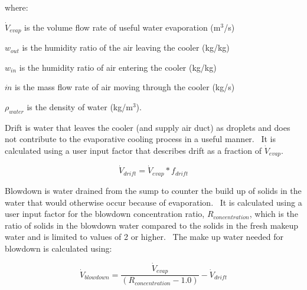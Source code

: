 where:

\({\dot V_{evap}}\) is the volume flow rate of useful water evaporation (m\(^{3}\)/s)

\({w_{out}}\) is the humidity ratio of the air leaving the cooler (kg/kg)

\({w_{in}}\) is the humidity ratio of air entering the cooler (kg/kg)

\(\dot m\) is the mass flow rate of air moving through the cooler (kg/s)

\({\rho_{water}}\) is the density of water (kg/m\(^{3}\)).

Drift is water that leaves the cooler (and supply air duct) as droplets and does not contribute to the evaporative cooling process in a useful manner.~ It is calculated using a user input factor that describes drift as a fraction of \({\dot V_{evap}}\).

\begin{equation}
{\dot V_{drift}} = {\dot V_{evap}} * {f_{drift}}
\end{equation}

Blowdown is water drained from the sump to counter the build up of solids in the water that would otherwise occur because of evaporation.~ It is calculated using a user input factor for the blowdown concentration ratio, \({R_{concentration}}\), which is the ratio of solids in the blowdown water compared to the solids in the fresh makeup water and is limited to values of 2 or higher.~ The make up water needed for blowdown is calculated using:

\begin{equation}
{\dot V_{blowdown}} = \frac{{{{\dot V}_{evap}}}}{{\left( {{R_{concentration}} - 1.0} \right)}} - {\dot V_{drift}}
\end{equation}
